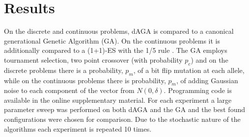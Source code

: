 \documentclass[runningheads,a4paper]{llncs}
\begin{document}

\section{Results}
\label{section:results}
On the discrete and continuous problems, dAGA is compared to a canonical generational Genetic Algorithm (GA). On the continuous problems it is additionally compared to a (1+1)-ES with the 1/5 rule \cite{Igel benchmarking}. The GA employs tournament selection, two point crossover (with probability \(p_c\)) and on the discrete problems there is a probability, \(p_m\), of a bit flip mutation at each allele, while on the continuous problems there is probability, \(p_m\), of adding Gaussian noise to each component of the vector from \(N(0, \delta)\). Programming code is available in the online supplementary material.  For each experiment a large parameter sweep was performed on both dAGA and the GA and the best found configurations were chosen for comparison. Due to the stochastic nature of the algorithms each experiment is repeated 10 times.
\end{document}
